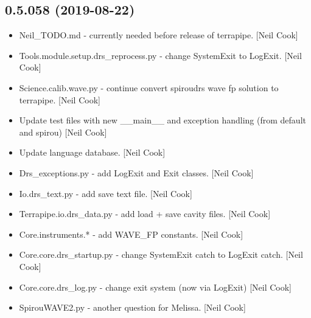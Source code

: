 \documentclass[a4paper,10pt,english]{report}
\begin{document}
\subsection{0.5.058 (2019-08-22)}
\label{\detokenize{misc/changelog:id83}}\begin{itemize}
\item {} 
Neil\_TODO.md - currently needed before release of terrapipe. {[}Neil
Cook{]}

\item {} 
Tools.module.setup.drs\_reprocess.py - change SystemExit to LogExit.
{[}Neil Cook{]}

\item {} 
Science.calib.wave.py - continue convert spiroudrs wave fp solution to
terrapipe. {[}Neil Cook{]}

\item {} 
Update test files with new \_\_main\_\_ and exception handling (from
default and spirou) {[}Neil Cook{]}

\item {} 
Update language database. {[}Neil Cook{]}

\item {} 
Drs\_exceptions.py - add LogExit and Exit classes. {[}Neil Cook{]}

\item {} 
Io.drs\_text.py - add save text file. {[}Neil Cook{]}

\item {} 
Terrapipe.io.drs\_data.py - add load + save cavity files. {[}Neil Cook{]}

\item {} 
Core.instruments.* - add WAVE\_FP constants. {[}Neil Cook{]}

\item {} 
Core.core.drs\_startup.py - change SystemExit catch to LogExit catch.
{[}Neil Cook{]}

\item {} 
Core.core.drs\_log.py - change exit system (now via LogExit) {[}Neil
Cook{]}

\item {} 
SpirouWAVE2.py - another question for Melissa. {[}Neil Cook{]}

\end{itemize}
\end{document}
